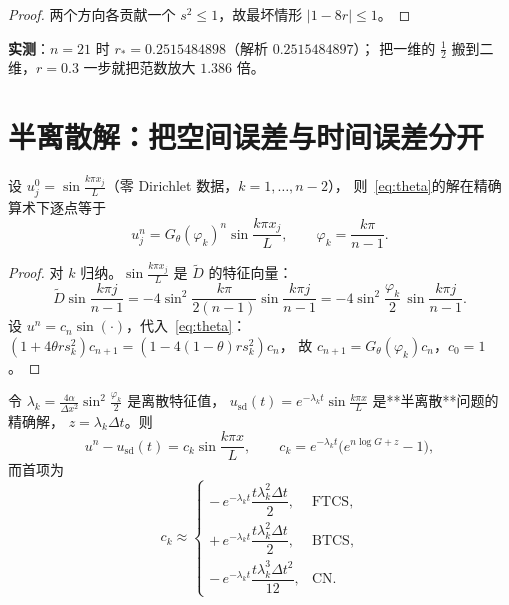 \begin{proof}
两个方向各贡献一个 $s^2\le1$，故最坏情形 $|1-8r|\le1$。
\end{proof}

\textbf{实测}：$n=21$ 时 $r_*=0.2515484898$（解析 $0.2515484897$）；
把一维的 $\frac12$ 搬到二维，$r=0.3$ 一步就把范数放大 $1.386$ 倍。

\section{半离散解：把空间误差与时间误差分开}

\begin{theorem}[单模态的精确演化]
\label{thm:mode}
设 $u_j^0=\sin\frac{k\pi x_j}L$（零 Dirichlet 数据，$k=1,\dots,n-2$），
则~\eqref{eq:theta}的解在精确算术下逐点等于
\begin{equation}
  u_j^n=G_\theta(\varphi_k)^n\sin\frac{k\pi x_j}L,
  \qquad \varphi_k=\frac{k\pi}{n-1}.
\end{equation}
\end{theorem}

\begin{proof}
对 $k$ 归纳。$\sin\frac{k\pi x_j}L$ 是 $\tilde D$ 的特征向量：
\begin{equation}
  \tilde D\sin\frac{k\pi j}{n-1}
  =-4\sin^2\frac{k\pi}{2(n-1)}\sin\frac{k\pi j}{n-1}
  =-4\sin^2\frac{\varphi_k}2\,\sin\frac{k\pi j}{n-1}.
\end{equation}
设 $u^n=c_n\sin(\cdot)$，代入~\eqref{eq:theta}：
$(1+4\theta rs_k^2)c_{n+1}=(1-4(1-\theta)rs_k^2)c_n$，
故 $c_{n+1}=G_\theta(\varphi_k)c_n$，$c_0=1$。
\end{proof}

\begin{corollary}[时间误差的闭式]
\label{cor:timeerr}
令 $\lambda_k=\frac{4\alpha}{\Delta x^2}\sin^2\frac{\varphi_k}2$ 是离散特征值，
$u_{\text{sd}}(t)=e^{-\lambda_kt}\sin\frac{k\pi x}L$ 是**半离散**问题的精确解，
$z=\lambda_k\Delta t$。则
\begin{equation}
  u^n-u_{\text{sd}}(t)=c_k\sin\frac{k\pi x}L,\qquad
  c_k=e^{-\lambda_kt}\bigl(e^{n\log G+z}-1\bigr),
\end{equation}
而首项为
\begin{equation}
  c_k\approx
  \begin{cases}
    -\,e^{-\lambda_kt}\dfrac{t\lambda_k^2\Delta t}{2}, & \text{FTCS},\\[2mm]
    +\,e^{-\lambda_kt}\dfrac{t\lambda_k^2\Delta t}{2}, & \text{BTCS},\\[2mm]
    -\,e^{-\lambda_kt}\dfrac{t\lambda_k^3\Delta t^2}{12}, & \text{CN}.
  \end{cases}
  \label{eq:timeerr}
\end{equation}
\end{corollary}

